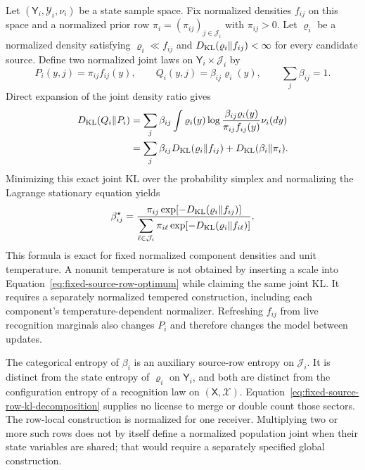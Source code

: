 Let \((\mathsf Y_i,\mathscr Y_i,\nu_i)\) be a state sample space. Fix normalized densities \(f_{ij}\) on this space and a normalized prior row \(\pi_i=(\pi_{ij})_{j\in\mathcal J_i}\) with \(\pi_{ij}>0\). Let \(\varrho_i\) be a normalized density satisfying \(\varrho_i\ll f_{ij}\) and \(D_{\mathrm{KL}}(\varrho_i\Vert f_{ij})<\infty\) for every candidate source. Define two normalized joint laws on \(\mathsf Y_i\times\mathcal J_i\) by
\begin{equation}
P_i(y,j)=\pi_{ij}f_{ij}(y),
\qquad
Q_i(y,j)=\beta_{ij}\varrho_i(y),
\qquad
\sum_j\beta_{ij}=1.
\label{eq:fixed-source-row-joints}
\end{equation}
Direct expansion of the joint density ratio gives
\begin{align}
D_{\mathrm{KL}}(Q_i\Vert P_i)
&=\sum_j\beta_{ij}
\int \varrho_i(y)
\log\frac{\beta_{ij}\varrho_i(y)}{\pi_{ij}f_{ij}(y)}\nu_i(dy)
\label{eq:fixed-source-row-kl-expansion}\\
&=\sum_j\beta_{ij}D_{\mathrm{KL}}(\varrho_i\Vert f_{ij})
+D_{\mathrm{KL}}(\beta_i\Vert\pi_i).
\label{eq:fixed-source-row-kl-decomposition}
\end{align}
Minimizing this exact joint KL over the probability simplex and normalizing the Lagrange stationary equation yields
\begin{equation}
\beta_{ij}^\star
=\frac{\pi_{ij}\exp[-D_{\mathrm{KL}}(\varrho_i\Vert f_{ij})]}
{\displaystyle\sum_{\ell\in\mathcal J_i}
\pi_{i\ell}\exp[-D_{\mathrm{KL}}(\varrho_i\Vert f_{i\ell})]}.
\label{eq:fixed-source-row-optimum}
\end{equation}
This formula is exact for fixed normalized component densities and unit temperature. A nonunit temperature is not obtained by inserting a scale into Equation~\eqref{eq:fixed-source-row-optimum} while claiming the same joint KL. It requires a separately normalized tempered construction, including each component's temperature-dependent normalizer. Refreshing \(f_{ij}\) from live recognition marginals also changes \(P_i\) and therefore changes the model between updates.

The categorical entropy of \(\beta_i\) is an auxiliary source-row entropy on \(\mathcal J_i\). It is distinct from the state entropy of \(\varrho_i\) on \(\mathsf Y_i\), and both are distinct from the configuration entropy of a recognition law on \((\mathsf X,\mathscr X)\). Equation~\eqref{eq:fixed-source-row-kl-decomposition} supplies no license to merge or double count those sectors.
The row-local construction is normalized for one receiver. Multiplying two or more such rows does not by itself define a normalized population joint when their state variables are shared; that would require a separately specified global construction.
